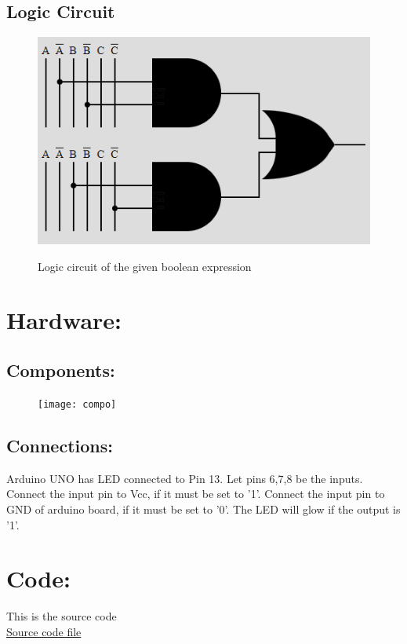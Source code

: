 \documentclass[a4paper,12pt,twocolumn]{article}
\begin{document}
\subsection{Logic Circuit}
\begin{figure}[h]
\centering
\includegraphics[width=0.8\columnwidth]{lc}
\label{Logic Circuit}
\caption{Logic circuit of the given boolean expression}
\end{figure}
\section{Hardware:}
\subsection{Components:}
\begin{figure}[h]
\centering
\texttt{[image: compo]}
\end{figure}
\subsection{Connections:}
Arduino UNO has LED connected to Pin 13. Let pins 6,7,8 be the inputs. Connect the input pin to Vcc, if it must be set to '1'. Connect the input pin to GND of arduino board, if it must be set to '0'. The LED will glow if the output is '1'.
\section{Code:}
This is the source code\\
\href{https://raw.githubusercontent.com/ShreyaniReddy/IITH-FWC/main/assignment.cpp}{Source code file}
\end{document}

